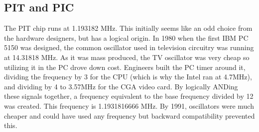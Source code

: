 \documentclass[book.tex]{subfiles}
\begin{document}
\subsection{PIT and PIC}
The PIT chip runs at 1.193182 MHz. This initially seems like an odd choice from the hardware designers, but has a logical origin. In 1980 when the first IBM PC 5150 was designed, the common oscillator used in television circuitry was running at 14.31818 MHz. As it was mass produced, the TV oscillator was very cheap so utilizing it in the PC drove down cost. Engineers built the PC timer around it, dividing the frequency by 3 for the CPU (which is why the Intel ran at 4.7MHz), and dividing by 4 to 3.57MHz for the CGA video card. By logically ANDing these signals together, a frequency equivalent to the base frequency divided by 12 was created. This frequency is 1.1931816666 MHz. By 1991, oscillators were much cheaper and could have used any frequency but backward compatibility prevented this.\\
\end{document}
